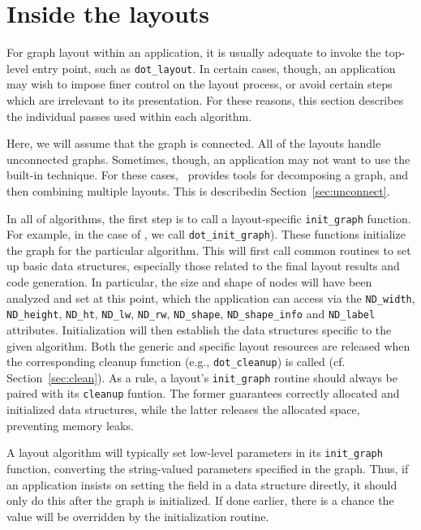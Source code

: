\section{Inside the layouts}
\label{sec:layouts}

For graph layout within an application, it is usually adequate to
invoke the top-level entry point, such as {\tt dot\_layout}. In
certain cases, though, an application may wish to impose finer
control on the layout process, or avoid certain steps which are
irrelevant to its presentation. For these reasons, this section
describes the individual passes used within each algorithm. 

Here, we will assume that the graph is connected. 
All of the layouts handle unconnected graphs. Sometimes, though,
an application may not want to use the built-in
technique. For these cases, \gviz\ provides tools for 
decomposing a graph, and then
combining multiple layouts. This is describedin Section~\ref{sec:unconnect}.

In all of algorithms, the first step is to call a layout-specific
{\tt init\_graph} function. For example, in the case of \dot, we
call {\tt dot\_init\_graph}). These functions 
initialize the graph for the particular algorithm.
This will first call common routines to set up basic data structures,
especially those related to the final layout results and
code generation. In particular, the size and shape of nodes will
have been analyzed and set at this point, which the application
can access via the {\tt ND\_width}, {\tt ND\_height}, 
{\tt ND\_ht}, {\tt ND\_lw}, 
{\tt ND\_rw}, {\tt ND\_shape}, {\tt ND\_shape\_info}
and {\tt ND\_label} attributes.
Initialization will then establish the data
structures specific to the given algorithm. Both the generic
and specific layout resources are released when the corresponding
cleanup function (e.g., {\tt dot\_cleanup}) is called (cf. Section~\ref{sec:clean}).
As a rule, a layout's {\tt init\_graph} routine should always be paired
with its {\tt cleanup} funtion. The former guarantees correctly
allocated and initialized data structures, while the latter releases
the allocated space, preventing memory leaks.

A layout algorithm will typically set low-level parameters in its
{\tt init\_graph} function, converting the string-valued parameters
specified in the graph. Thus, if an application insists on setting the
field in a data structure directly, it should only do this after the graph
is initialized. If done earlier, there is a chance the value will be
overridden by the initialization routine.

